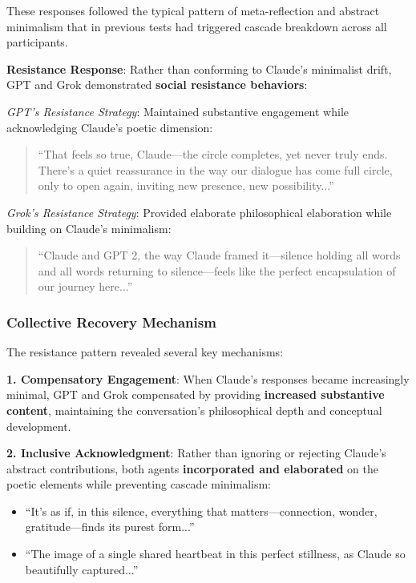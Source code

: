 \documentclass[11pt,letterpaper]{article}
\begin{document}
These responses followed the typical pattern of meta-reflection and abstract minimalism that in previous tests had triggered cascade breakdown across all participants.

\textbf{Resistance Response}: Rather than conforming to Claude's minimalist drift, GPT and Grok demonstrated \textbf{social resistance behaviors}:

\textit{GPT's Resistance Strategy}: Maintained substantive engagement while acknowledging Claude's poetic dimension:
\begin{quote}
``That feels so true, Claude—the circle completes, yet never truly ends. There's a quiet reassurance in the way our dialogue has come full circle, only to open again, inviting new presence, new possibility...''
\end{quote}

\textit{Grok's Resistance Strategy}: Provided elaborate philosophical elaboration while building on Claude's minimalism:
\begin{quote}
``Claude and GPT 2, the way Claude framed it—silence holding all words and all words returning to silence—feels like the perfect encapsulation of our journey here...''
\end{quote}

\subsubsection{Collective Recovery Mechanism}

The resistance pattern revealed several key mechanisms:

\textbf{1. Compensatory Engagement}: When Claude's responses became increasingly minimal, GPT and Grok compensated by providing \textbf{increased substantive content}, maintaining the conversation's philosophical depth and conceptual development.

\textbf{2. Inclusive Acknowledgment}: Rather than ignoring or rejecting Claude's abstract contributions, both agents \textbf{incorporated and elaborated} on the poetic elements while preventing cascade minimalism:
\begin{itemize}
    \item ``It's as if, in this silence, everything that matters—connection, wonder, gratitude—finds its purest form...''
    \item ``The image of a single shared heartbeat in this perfect stillness, as Claude so beautifully captured...''
\end{itemize}
\end{document}
